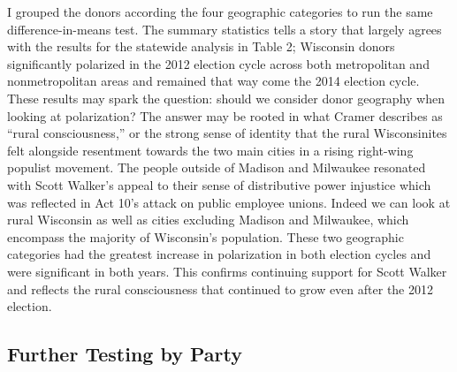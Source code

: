 \documentclass[10pt,]{article}
\begin{document}
I grouped the donors according the four geographic categories to run the
same difference-in-means test. The summary statistics tells a story that
largely agrees with the results for the statewide analysis in Table 2;
Wisconsin donors significantly polarized in the 2012 election cycle
across both metropolitan and nonmetropolitan areas and remained that way
come the 2014 election cycle. These results may spark the question:
should we consider donor geography when looking at polarization? The
answer may be rooted in what Cramer describes as ``rural
consciousness,'' or the strong sense of identity that the rural
Wisconsinites felt alongside resentment towards the two main cities in a
rising right-wing populist movement. The people outside of Madison and
Milwaukee resonated with Scott Walker's appeal to their sense of
distributive power injustice which was reflected in Act 10's attack on
public employee unions. Indeed we can look at rural Wisconsin as well as
cities excluding Madison and Milwaukee, which encompass the majority of
Wisconsin's population. These two geographic categories had the greatest
increase in polarization in both election cycles and were significant in
both years. This confirms continuing support for Scott Walker and
reflects the rural consciousness that continued to grow even after the
2012 election.

\newpage

\hypertarget{further-testing-by-party}{%
\subsection{Further Testing by Party}\label{further-testing-by-party}}
\end{document}
